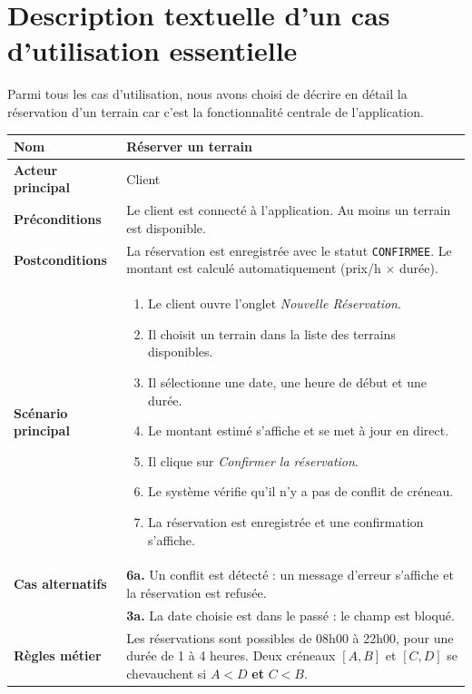 \documentclass[12pt, a4paper]{report}
\begin{document}
\section{Description textuelle d'un cas d'utilisation essentielle}

Parmi tous les cas d'utilisation, nous avons choisi de décrire en détail
la réservation d'un terrain car c'est la fonctionnalité centrale de
l'application.

\vspace{0.4cm}
\begin{center}
\begin{tabular}{>{\bfseries}p{4.2cm} p{8.8cm}}
\toprule
Nom & Réserver un terrain \\
\midrule
Acteur principal & Client \\
\addlinespace
Préconditions &
  Le client est connecté à l'application.
  Au moins un terrain est disponible. \\
\addlinespace
Postconditions &
  La réservation est enregistrée avec le statut \texttt{CONFIRMEE}.
  Le montant est calculé automatiquement (prix/h $\times$ durée). \\
\addlinespace
Scénario principal &
  \begin{enumerate}
    \item Le client ouvre l'onglet \textit{Nouvelle Réservation}.
    \item Il choisit un terrain dans la liste des terrains disponibles.
    \item Il sélectionne une date, une heure de début et une durée.
    \item Le montant estimé s'affiche et se met à jour en direct.
    \item Il clique sur \textit{Confirmer la réservation}.
    \item Le système vérifie qu'il n'y a pas de conflit de créneau.
    \item La réservation est enregistrée et une confirmation s'affiche.
  \end{enumerate} \\
\addlinespace
Cas alternatifs &
  \textbf{6a.} Un conflit est détecté : un message d'erreur s'affiche
  et la réservation est refusée. \\
& \textbf{3a.} La date choisie est dans le passé : le champ est bloqué. \\
\addlinespace
Règles métier &
  Les réservations sont possibles de 08h00 à 22h00, pour une durée
  de 1 à 4 heures. Deux créneaux $[A,B]$ et $[C,D]$ se chevauchent
  si $A < D$ \textbf{et} $C < B$. \\
\bottomrule
\end{tabular}
\end{center}
\end{document}
